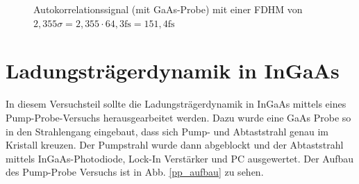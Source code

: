 \begin{figure}
  \centering
  \caption{Autokorrelationssignal (mit GaAs-Probe) mit einer FDHM von $2,355\sigma=2,355\cdot 64,3\si{\femto\second}=151,4\si{\femto\second}$}
  \label{autokorr_gaas}
\end{figure}
	
	
\section{Ladungsträgerdynamik in InGaAs}	
In diesem Versuchsteil sollte die Ladungsträgerdynamik in InGaAs mittels eines Pump-Probe-Versuchs herausgearbeitet werden. Dazu wurde eine GaAs Probe so in den Strahlengang eingebaut, dass sich Pump- und Abtaststrahl genau im Kristall kreuzen. Der Pumpstrahl wurde dann abgeblockt und der Abtaststrahl mittels InGaAs-Photodiode, Lock-In Verstärker und PC ausgewertet. Der Aufbau des Pump-Probe Versuchs ist in Abb. \ref{pp_aufbau} zu sehen.

